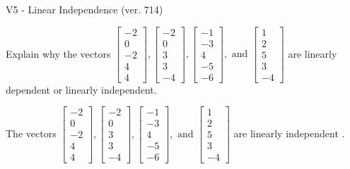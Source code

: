 \begin{exercise}
  \begin{exerciseTitle}V5 - Linear Independence (ver. 714)\end{exerciseTitle}
  \begin{exerciseStatement}
    Explain why the vectors \(\left[\begin{array}{r}
-2 \\
0 \\
-2 \\
4 \\
4
\end{array}\right] , \left[\begin{array}{r}
-2 \\
0 \\
3 \\
3 \\
-4
\end{array}\right] , \left[\begin{array}{r}
-1 \\
-3 \\
4 \\
-5 \\
-6
\end{array}\right] , \text{ and } \left[\begin{array}{r}
1 \\
2 \\
5 \\
3 \\
-4
\end{array}\right]\) are linearly dependent or linearly independent.	


  \end{exerciseStatement}
  \begin{exerciseAnswer}
   The vectors \(\left[\begin{array}{r}
-2 \\
0 \\
-2 \\
4 \\
4
\end{array}\right] , \left[\begin{array}{r}
-2 \\
0 \\
3 \\
3 \\
-4
\end{array}\right] , \left[\begin{array}{r}
-1 \\
-3 \\
4 \\
-5 \\
-6
\end{array}\right] , \text{ and } \left[\begin{array}{r}
1 \\
2 \\
5 \\
3 \\
-4
\end{array}\right]\) are 
  	 linearly independent  .
  


  \end{exerciseAnswer}
\end{exercise}